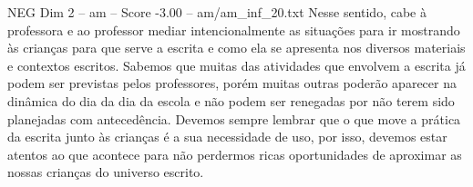 \begin{textsample}{NEG Dim 2 – am – Score -3.00 – am/am\_inf\_20.txt}
Nesse sentido, cabe à professora e ao professor mediar intencionalmente as situações para ir mostrando às crianças para que serve a escrita e como ela se apresenta nos diversos materiais e contextos escritos.
Sabemos que muitas das atividades que envolvem a escrita já podem ser previstas pelos professores, porém muitas outras poderão aparecer na dinâmica do dia da dia da escola e não podem ser renegadas por não terem sido planejadas com antecedência.
Devemos sempre lembrar que o que move a prática da escrita junto às crianças é a sua necessidade de uso, por isso, devemos estar atentos ao que acontece para não perdermos ricas oportunidades de aproximar as nossas crianças do universo escrito.

\end{textsample}
